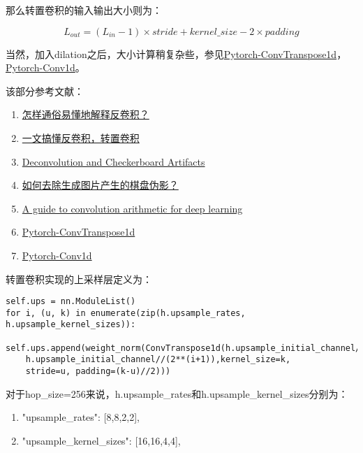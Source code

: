\documentclass[cn,10pt,math=newtx,citestyle=gb7714-2015,bibstyle=gb7714-2015]{elegantbook}
\begin{document}
那么转置卷积的输入输出大小则为：

\begin{equation}
  L_{out}=(L_{in}-1)\times stride+kernel\_size-2\times padding
\end{equation}

当然，加入dilation之后，大小计算稍复杂些，参见\href{https://pytorch.org/docs/master/generated/torch.nn.ConvTranspose1d.html}{Pytorch-ConvTranspose1d}，\href{https://pytorch.org/docs/master/generated/torch.nn.Conv1d.html}{Pytorch-Conv1d}。

该部分参考文献：

\begin{enumerate}
  \item \href{https://www.zhihu.com/question/48279880/answer/1682194600}{怎样通俗易懂地解释反卷积？}
  \item \href{https://zhuanlan.zhihu.com/p/158933003}{一文搞懂反卷积，转置卷积}
  \item \href{https://distill.pub/2016/deconv-checkerboard}{Deconvolution and Checkerboard Artifacts}
  \item \href{https://www.zhihu.com/question/436832427/answer/1679396968}{如何去除生成图片产生的棋盘伪影？}
  \item \href{https://arxiv.org/abs/1603.07285}{A guide to convolution arithmetic for deep learning}
  \item \href{https://pytorch.org/docs/master/generated/torch.nn.ConvTranspose1d.html}{Pytorch-ConvTranspose1d}
  \item \href{https://pytorch.org/docs/master/generated/torch.nn.Conv1d.html}{Pytorch-Conv1d}
\end{enumerate}
  
转置卷积实现的上采样层定义为：

\begin{lstlisting}
self.ups = nn.ModuleList()
for i, (u, k) in enumerate(zip(h.upsample_rates, h.upsample_kernel_sizes)):
    self.ups.append(weight_norm(ConvTranspose1d(h.upsample_initial_channel//(2**i), 
    h.upsample_initial_channel//(2**(i+1)),kernel_size=k, 
    stride=u, padding=(k-u)//2)))
\end{lstlisting}

对于hop\_size=256来说，h.upsample\_rates和h.upsample\_kernel\_sizes分别为：

\begin{enumerate}
  \item "upsample\_rates": [8,8,2,2],
  \item "upsample\_kernel\_sizes": [16,16,4,4],
\end{enumerate}
\end{document}
